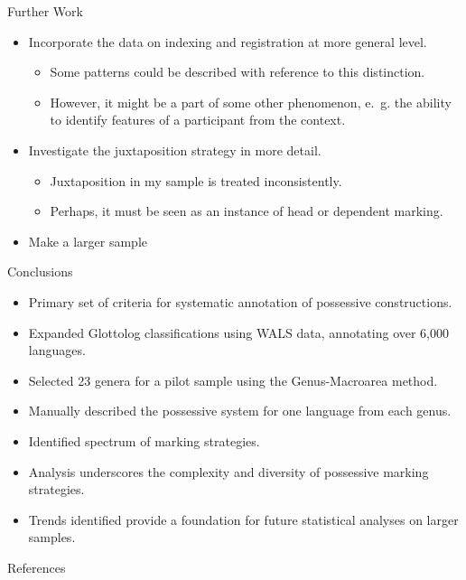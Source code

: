 \documentclass[12pt,aspectratio=169,t]{beamer}
\renewcommand{\'}{\textquotesingle}
\begin{document}
\begin{frame}{Further Work}
	\begin{itemize}
		\item Incorporate the data on indexing and registration at more general level.
		\begin{itemize}
			\item Some patterns could be described with reference to this distinction.
			\item However, it might be a part of some other phenomenon, e.~g. the ability to identify features of a participant from the context.
		\end{itemize}
		\item Investigate the juxtaposition strategy in more detail.
		\begin{itemize}
			\item Juxtaposition in my sample is treated inconsistently.
			\item Perhaps, it must be seen as an instance of head or dependent marking.
		\end{itemize}
		\item Make a larger sample
	\end{itemize}
\end{frame}

\begin{frame}{Conclusions}
	\small
	\begin{itemize}
		\setlength{\itemsep}{0pt}
		\item Primary set of criteria for systematic annotation of possessive constructions.
		\item Expanded Glottolog classifications using WALS data, annotating over 6,000 languages.
		\item Selected 23 genera for a pilot sample using the Genus-Macroarea method.
		\item Manually described the possessive system for one language from each genus.
		\item Identified spectrum of marking strategies.
		\item Analysis underscores the complexity and diversity of possessive marking strategies.
		\item Trends identified provide a foundation for future statistical analyses on larger samples.
	\end{itemize}
\end{frame}


\begin{frame}[allowframebreaks,t]{References}
    \printbibliography
\end{frame}
\end{document}
